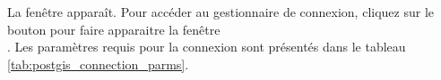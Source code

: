 La fenêtre  apparaît. Pour accéder au gestionnaire de connexion, cliquez sur le bouton  pour faire apparaitre la fenêtre\\ . Les paramètres requis pour la connexion sont présentés dans le tableau \ref{tab:postgis_connection_parms}.

\begin{table}[ht]
\centering


\end{table}
